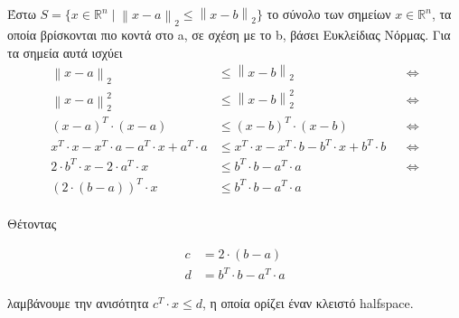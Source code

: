 \documentclass[12pt]{article}
\newcommand{\R}{\mathbb{R}}
\newcommand{\norm}[1]{\left\lVert#1\right\rVert}
\begin{document}
Έστω $S = \lbrace x \in \R^{n} \mid \norm{x - a}_2 \leq \norm{x - b}_2 \rbrace$ το σύνολο
των σημείων $x \in \R^{n}$, τα οποία βρίσκονται πιο κοντά στο a, σε σχέση με το b, 
βάσει Ευκλείδιας Νόρμας. Για τα σημεία αυτά ισχύει \\

\begin{align*}
    \norm{x - a}_2 & \leq \norm{x - b}_2 && \Leftrightarrow \\
    \norm{x - a}_2^2 & \leq \norm{x - b}_2^2 && \Leftrightarrow \\
    (x - a)^T \cdot (x - a) & \leq (x - b)^T \cdot (x - b) && \Leftrightarrow \\
    x^T \cdot x - x^T \cdot a - a^T \cdot x + a^T \cdot a & \leq x^T \cdot x - x^T \cdot b - b^T \cdot x + b^T \cdot b && \Leftrightarrow \\
    2 \cdot b^T \cdot x - 2 \cdot a^T \cdot x & \leq b^T \cdot b - a^T \cdot a && \Leftrightarrow \\
    (2 \cdot (b - a))^T \cdot x & \leq b^T \cdot b - a^T \cdot a
\end{align*}\\

Θέτοντας

\begin{align*}
    c & = 2 \cdot (b - a) \\
    d & = b^T \cdot b - a^T \cdot a
\end{align*}

λαμβάνουμε την ανισότητα $c^T \cdot x \leq d$, η οποία ορίζει έναν κλειστό halfspace.
\end{document}
